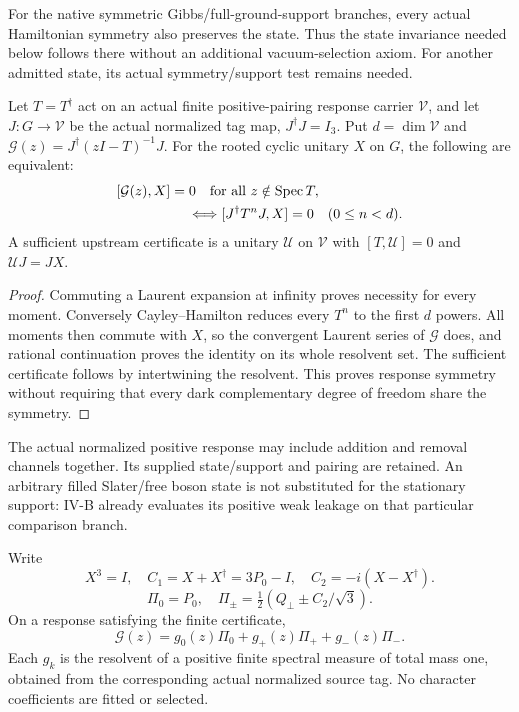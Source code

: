 \documentclass[12pt,a4paper]{article}
\begin{document}
For the native symmetric Gibbs/full-ground-support branches, every actual
Hamiltonian symmetry also preserves the state. Thus the state invariance
needed below follows there without an additional vacuum-selection axiom.
For another admitted state, its actual symmetry/support test remains needed.

\begin{proposition}
\label{p4:v251:prop:finite-response-symmetry}
Let $T=T^\dagger$ act on an actual finite positive-pairing response carrier
$\mathcal V$, and let $J:G\to\mathcal V$ be the actual normalized tag map,
$J^\dagger J=I_3$. Put $d=\dim\mathcal V$ and
$\mathcal G(z)=J^\dagger(zI-T)^{-1}J$. For the rooted cyclic unitary
$X$ on $G$, the following are equivalent:
\[
 \begin{aligned}
 &[\mathcal G(z),X]=0\quad\hbox{for all }z\notin\operatorname{Spec}T,\\
 &\hspace{18mm}\Longleftrightarrow
 [J^\dagger T^nJ,X]=0\quad(0\le n<d).
 \end{aligned}
\]
A sufficient upstream certificate is a unitary $\mathcal U$ on
$\mathcal V$ with $[T,\mathcal U]=0$ and $\mathcal UJ=JX$.
\end{proposition}
\begin{proof}
Commuting a Laurent expansion at infinity proves necessity for every moment.
Conversely Cayley--Hamilton reduces every $T^n$ to the first $d$ powers.
All moments then commute with $X$, so the convergent Laurent series of
$\mathcal G$ does, and rational continuation proves the identity on its
whole resolvent set. The sufficient certificate follows by intertwining
the resolvent. This proves response symmetry without requiring that every
dark complementary degree of freedom share the symmetry.
\end{proof}

The actual normalized positive response may include addition and removal
channels together. Its supplied state/support and pairing are retained.
An arbitrary filled Slater/free boson state is not substituted for the
stationary support: IV-B already evaluates its positive weak leakage on
that particular comparison branch.

Write
\[
 X^3=I,\quad C_1=X+X^\dagger=3P_0-I,\quad C_2=-i(X-X^\dagger).
\]
\[
 \Pi_0=P_0,\quad \Pi_\pm=\tfrac12(Q_\perp\pm C_2/\sqrt3).
\]
On a response satisfying the finite certificate,
\[
 \boxed{\mathcal G(z)=g_0(z)\Pi_0+g_+(z)\Pi_++g_-(z)\Pi_-.}
\]
Each $g_k$ is the resolvent of a positive finite spectral measure of total
mass one, obtained from the corresponding actual normalized source tag.
No character coefficients are fitted or selected.
\end{document}

